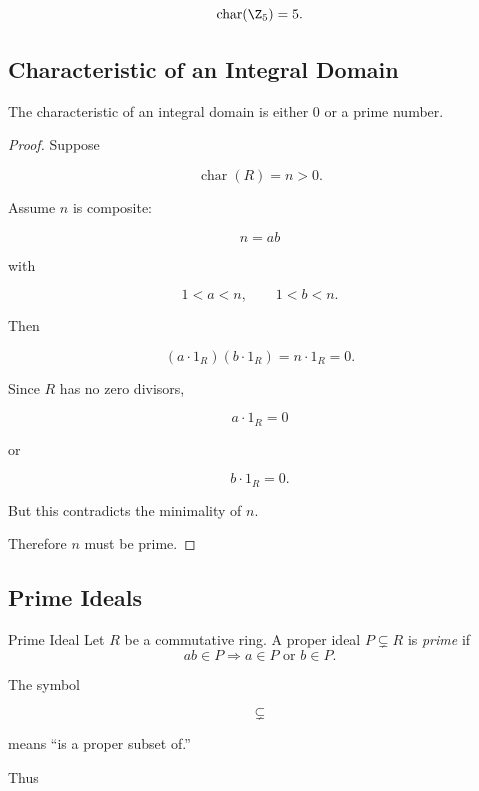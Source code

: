 \[ \operatorname{char}(\Z_5)=5. \]

\subsection{Characteristic of an Integral Domain}
\label{subsec:domain-characteristic}

\begin{theorem}
The characteristic of an integral domain is either \(0\) or a prime number.
\end{theorem}

\begin{proof}
Suppose

\[ \operatorname{char}(R)=n>0. \]

Assume \(n\) is composite:

\[ n=ab \]

with

\[ 1<a<n,\qquad1<b<n. \]

Then

\[ (a\cdot1_R)(b\cdot1_R)=n\cdot1_R=0. \]

Since \(R\) has no zero divisors,

\[ a\cdot1_R=0 \]

or

\[ b\cdot1_R=0. \]

But this contradicts the minimality of \(n\).

Therefore \(n\) must be prime.
\end{proof}

\subsection{Prime Ideals}
\label{subsec:prime-ideals}

\begin{definitionbox}{Prime Ideal}
Let \(R\) be a commutative ring. A proper ideal \(P\subsetneq R\) is
\emph{prime} if
\[ ab\in P\Longrightarrow a\in P\text{ or }b\in P. \]
\end{definitionbox}

The symbol

\[ \subsetneq \]

means ``is a proper subset of.''

Thus

